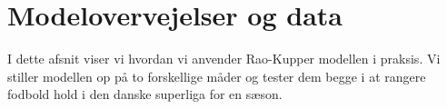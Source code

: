 \documentclass[11pt,a4paper]{article}
\begin{document}
\section{Modelovervejelser og data}
I dette afsnit viser vi hvordan vi anvender Rao-Kupper modellen i praksis. Vi stiller modellen op på to forskellige måder og tester dem begge i at rangere fodbold hold i den danske superliga for en sæson. 
\end{document}

